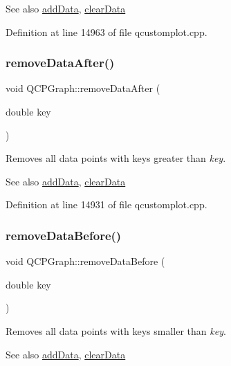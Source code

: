 \begin{DoxySeeAlso}{See also}
\hyperlink{class_q_c_p_graph_aa5c6181d84db72ce4dbe9dc15a34ef4f}{add\+Data}, \hyperlink{class_q_c_p_graph_ad4e94a4e44e5e76fbec81a72a977157d}{clear\+Data} 
\end{DoxySeeAlso}


Definition at line 14963 of file qcustomplot.\+cpp.

\mbox{\label{class_q_c_p_graph_ae42d645ef617cfc75fc0df58e62c522a}} 
\subsubsection{\texorpdfstring{remove\+Data\+After()}{removeDataAfter()}}
{\footnotesize\ttfamily void Q\+C\+P\+Graph\+::remove\+Data\+After (\begin{DoxyParamCaption}\item[{double}]{key }\end{DoxyParamCaption})}

Removes all data points with keys greater than {\itshape key}. \begin{DoxySeeAlso}{See also}
\hyperlink{class_q_c_p_graph_aa5c6181d84db72ce4dbe9dc15a34ef4f}{add\+Data}, \hyperlink{class_q_c_p_graph_ad4e94a4e44e5e76fbec81a72a977157d}{clear\+Data} 
\end{DoxySeeAlso}


Definition at line 14931 of file qcustomplot.\+cpp.

\mbox{\label{class_q_c_p_graph_a9fe0b3e54e8c7b61319bd03337e21e99}} 
\subsubsection{\texorpdfstring{remove\+Data\+Before()}{removeDataBefore()}}
{\footnotesize\ttfamily void Q\+C\+P\+Graph\+::remove\+Data\+Before (\begin{DoxyParamCaption}\item[{double}]{key }\end{DoxyParamCaption})}

Removes all data points with keys smaller than {\itshape key}. \begin{DoxySeeAlso}{See also}
\hyperlink{class_q_c_p_graph_aa5c6181d84db72ce4dbe9dc15a34ef4f}{add\+Data}, \hyperlink{class_q_c_p_graph_ad4e94a4e44e5e76fbec81a72a977157d}{clear\+Data} 
\end{DoxySeeAlso}


